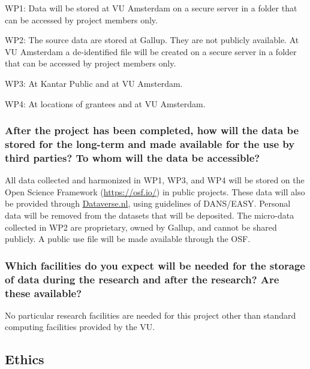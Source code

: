 \documentclass[twocolumn, serif, rga, numeric]{jote-article}
\begin{document}
WP1: Data will be stored at VU Amsterdam on a secure server in a folder that can be accessed by project members only.

WP2: The source data are stored at Gallup. They are not publicly available. At VU Amsterdam a de-identified file will be created on a secure server in a folder that can be accessed by project members only.

WP3: At Kantar Public and at VU Amsterdam.

WP4: At locations of grantees and at VU Amsterdam.

 {}\subsubsection*{After the project has been completed, how will the data be stored for the long-term and made available for the use by third parties? To whom will the data be accessible?} 

All data collected and harmonized in WP1, WP3, and WP4 will be stored on the Open Science Framework (\href{https://osf.io/}{https://osf.io/}) in public projects.
These data will also be provided through \href{Dataverse.nl}{Dataverse.nl}, using guidelines of DANS/EASY. Personal data will be removed from the datasets that will be deposited. The micro-data collected in WP2 are proprietary, owned by Gallup, and cannot be shared publicly. A public use file will be made available through the OSF.

 {}\subsubsection*{Which facilities do you expect will be needed for the storage of data during the research and after the research? Are these available?} 

No particular research facilities are needed for this project other than standard computing facilities provided by the VU.

 {}\subsection*{Ethics} 
\end{document}
